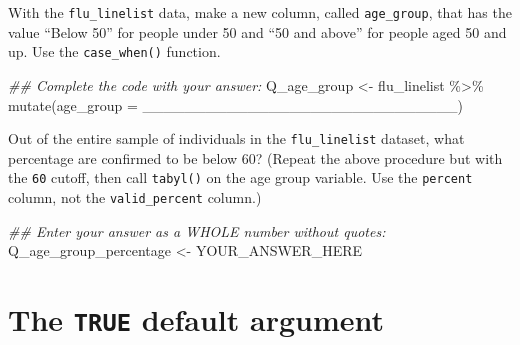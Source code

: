 \documentclass[
  letterpaper,
  DIV=11,
  numbers=noendperiod]{scrreprt}
\newenvironment{Shaded}{\begin{snugshade}}{\end{snugshade}}
\newcommand{\AttributeTok}[1]{\textcolor[rgb]{0.40,0.45,0.13}{#1}}
\newcommand{\DocumentationTok}[1]{\textcolor[rgb]{0.37,0.37,0.37}{\textit{#1}}}
\newcommand{\FunctionTok}[1]{\textcolor[rgb]{0.28,0.35,0.67}{#1}}
\newcommand{\NormalTok}[1]{\textcolor[rgb]{0.00,0.23,0.31}{#1}}
\newcommand{\OtherTok}[1]{\textcolor[rgb]{0.00,0.23,0.31}{#1}}
\newcommand{\SpecialCharTok}[1]{\textcolor[rgb]{0.37,0.37,0.37}{#1}}
\begin{document}
\begin{tcolorbox}[enhanced jigsaw, colframe=quarto-callout-tip-color-frame, rightrule=.15mm, opacityback=0, breakable, coltitle=black, colbacktitle=quarto-callout-tip-color!10!white, bottomrule=.15mm, leftrule=.75mm, toprule=.15mm, arc=.35mm, bottomtitle=1mm, colback=white, left=2mm, opacitybacktitle=0.6, titlerule=0mm, title=\textcolor{quarto-callout-tip-color}{\faLightbulb}\hspace{0.5em}{Practice}, toptitle=1mm]

With the \texttt{flu\_linelist} data, make a new column, called
\texttt{age\_group}, that has the value ``Below 50'' for people under 50
and ``50 and above'' for people aged 50 and up. Use the
\texttt{case\_when()} function.

\begin{Shaded}
\begin{Highlighting}[]
\DocumentationTok{\#\# Complete the code with your answer:}
\NormalTok{Q\_age\_group }\OtherTok{\textless{}{-}} 
\NormalTok{  flu\_linelist }\SpecialCharTok{\%\textgreater{}\%} 
  \FunctionTok{mutate}\NormalTok{(}\AttributeTok{age\_group =}\NormalTok{ \_\_\_\_\_\_\_\_\_\_\_\_\_\_\_\_\_\_\_\_\_\_\_\_\_\_\_\_\_\_)}
\end{Highlighting}
\end{Shaded}

Out of the entire sample of individuals in the \texttt{flu\_linelist}
dataset, what percentage are confirmed to be below 60? (Repeat the above
procedure but with the \texttt{60} cutoff, then call \texttt{tabyl()} on
the age group variable. Use the \texttt{percent} column, not the
\texttt{valid\_percent} column.)

\begin{Shaded}
\begin{Highlighting}[]
\DocumentationTok{\#\# Enter your answer as a WHOLE number without quotes:}
\NormalTok{Q\_age\_group\_percentage }\OtherTok{\textless{}{-}}\NormalTok{ YOUR\_ANSWER\_HERE}
\end{Highlighting}
\end{Shaded}

\end{tcolorbox}

\hypertarget{the-true-default-argument}{%
\section{\texorpdfstring{The \texttt{TRUE} default
argument}{The TRUE default argument}}\label{the-true-default-argument}}
\end{document}
